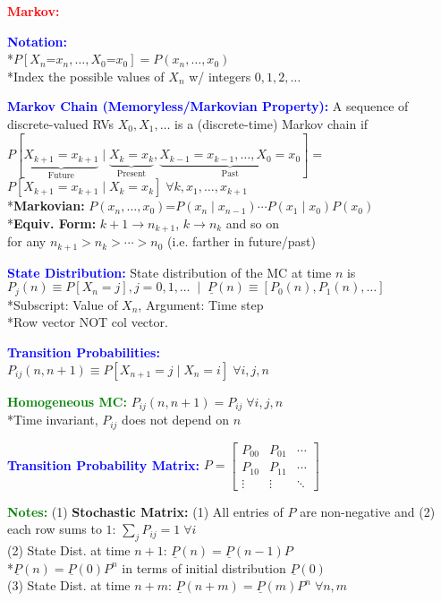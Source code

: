 \documentclass[5pt]{extarticle} %
\begin{document}
\begin{paracol}{3}
{    \textcolor{red}{\textbf{Markov:}} 

    \textcolor{blue}{\textbf{Notation:}} \\
    *$P[X_n \text{=} x_n,\ldots,X_0\text{=} x_0] = P(x_n,\ldots,x_0)$ \\
    *Index the possible values of $X_n$ w/ integers $0,1,2,\ldots$ 
    
    \textcolor{blue}{\textbf{Markov Chain (Memoryless/Markovian Property):}}
    A sequence of discrete-valued RVs $X_0,X_1,\ldots$ is a (discrete-time) Markov chain if \\ 
    $P[\underbrace{X_{k+1} = x_{k+1}}_{\text{Future}} \mid \underbrace{X_k = x_k}_{\text{Present}}, \underbrace{X_{k-1} = x_{k-1},\ldots,X_0=x_0}_{\text{Past}}] = $ \\
    $P[X_{k+1} = x_{k+1} \mid X_k = x_k] \; \forall k, x_1,\ldots,x_{k+1}$ \\
    *\textbf{Markovian:} $P(x_n,\ldots,x_0) \text{=} P(x_n \mid x_{n-1}) \cdots P(x_1 \mid x_0) P(x_0)$ \\
    *\textbf{Equiv. Form:} $k+1 \rightarrow n_{k+1}$, $k \rightarrow n_k$ and so on \\
    for any $n_{k+1} > n_k > \cdots > n_0$ (i.e. farther in future/past) 

    \textcolor{blue}{\textbf{State Distribution:}} State distribution of the MC at time $n$ is $P_j(n) \equiv P[X_n = j], j=0,1,\ldots \; \mid \; \underline{P}(n) \equiv [P_0(n), P_1(n), \ldots]$ \\
    *Subscript: Value of $X_n$, Argument: Time step \\
    *Row vector NOT col vector.

    \textcolor{blue}{\textbf{Transition Probabilities:}} \\ 
    $P_{ij} (n,n+1) \equiv P[X_{n+1} = j \mid X_n = i] \; \forall i,j,n$ 

    \textcolor{green}{\textbf{Homogeneous MC:}} $P_{ij}(n,n+1) = P_{ij} \; \forall i,j,n$ \\
    *Time invariant, $P_{ij}$ does not depend on $n$

    \textcolor{blue}{\textbf{Transition Probability Matrix:}} $P = \begin{bmatrix}
        P_{00} & P_{01} & \cdots \\
        P_{10} & P_{11} & \cdots \\
        \vdots & \vdots & \ddots
    \end{bmatrix}$ 

    \textcolor{green}{\textbf{Notes:}} (1) \textbf{Stochastic Matrix:} (1) All entries of $P$ are non-negative and (2) each row sums to $1$: $\sum_{j} P_{ij} = 1 \; \forall i$ \\
    (2) State Dist. at time $n+1$: $\underline{P}(n) = \underline{P}(n-1) P$ \\
    *$\underline{P}(n) = \underline{P}(0) P^n$ in terms of initial distribution $\underline{P}(0)$\\
    (3) State Dist. at time $n+m$: $\underline{P}(n+m) = \underline{P}(m) P^n \; \forall n,m$

}
\end{paracol}
\end{document}
